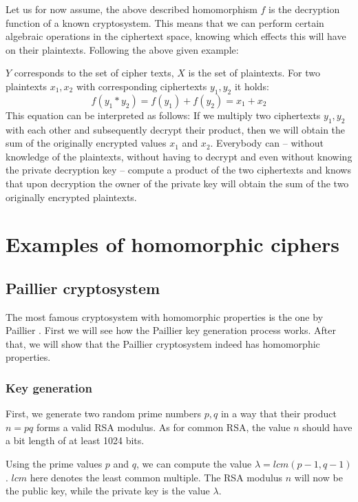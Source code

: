 \begin{bibunit}[babalpha]
Let us for now assume, the above described homomorphism $f$ is the decryption function of a known cryptosystem. This means that we can perform certain algebraic operations in the ciphertext space, knowing which effects this will have on their plaintexts. Following the above given example:

$Y$ corresponds to the set of cipher texts, $X$ is the set of plaintexts. For two plaintexts $x_1, x_2$ with corresponding ciphertexts $y_1, y_2$ it holds:
%
$$f(y_1  * y_2) = f(y_1) + f(y_2) = x_1  + x_2$$
%
This equation can be interpreted as follows: If we multiply two ciphertexts $y_1, y_2$ with each other and subsequently decrypt their product, then we will obtain the sum of the originally encrypted values $x_1$ and $x_2$. Everybody can -- without knowledge of the plaintexts, without having to decrypt and even without knowing the private decryption key -- compute a product of the two ciphertexts and knows that upon decryption the owner of the private key will obtain the sum of the two originally encrypted plaintexts.

\section{Examples of homomorphic ciphers}

\subsection{Paillier cryptosystem}

The most famous cryptosystem with homomorphic properties is the one by Paillier \cite{Paillier1999}. First we will see how the Paillier key generation process works. After that, we will show that the Paillier cryptosystem indeed has homomorphic properties.

\subsubsection{Key generation}

First, we generate two random prime numbers $p,q$ in a way that their product $n=pq$ forms  a valid RSA modulus. As for common RSA, the value $n$ should have a bit length of at least 1024 bits.

Using the prime values $p$ and $q$, we can compute the value $\lambda = \textit{lcm}(p-1,q-1)$. $\textit{lcm}$ here denotes the least common multiple. The RSA modulus $n$ will now be the public key, while the private key is the value $\lambda$.


\end{bibunit}
